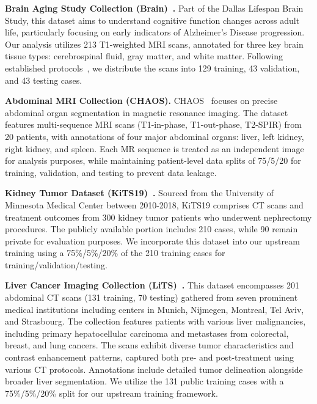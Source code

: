 \noindent\textbf{Brain Aging Study Collection (Brain)~\cite{rodrigue2012beta}.} Part of the Dallas Lifespan Brain Study, this dataset aims to understand cognitive function changes across adult life, particularly focusing on early indicators of Alzheimer's Disease progression. Our analysis utilizes 213 T1-weighted MRI scans, annotated for three key brain tissue types: cerebrospinal fluid, gray matter, and white matter. Following established protocols~\cite{rao2022improving}, we distribute the scans into 129 training, 43 validation, and 43 testing cases.

\noindent\textbf{Abdominal MRI Collection (CHAOS).} CHAOS~\cite{CHAOS2021} focuses on precise abdominal organ segmentation in magnetic resonance imaging. The dataset features multi-sequence MRI scans (T1-in-phase, T1-out-phase, T2-SPIR) from 20 patients, with annotations of four major abdominal organs: liver,  left kidney, right kidney, and spleen. Each MR sequence is treated as an independent image for analysis purposes, while maintaining patient-level data splits of 75/5/20 for training, validation, and testing to prevent data leakage.

\noindent\textbf{Kidney Tumor Dataset (KiTS19)~\cite{heller2019kits19}.} Sourced from the University of Minnesota Medical Center between 2010-2018, KiTS19 comprises CT scans and treatment outcomes from 300 kidney tumor patients who underwent nephrectomy procedures. The publicly available portion includes 210 cases, while 90 remain private for evaluation purposes. We incorporate this dataset into our upstream training using a 75\%/5\%/20\% of the 210 training cases for training/validation/testing.




\noindent\textbf{Liver Cancer Imaging Collection (LiTS)~\cite{bilic2019liver}.} This dataset encompasses 201 abdominal CT scans (131 training, 70 testing) gathered from seven prominent medical institutions including centers in Munich, Nijmegen, Montreal, Tel Aviv, and Strasbourg. The collection features patients with various liver malignancies, including primary hepatocellular carcinoma and metastases from colorectal, breast, and lung cancers. The scans exhibit diverse tumor characteristics and contrast enhancement patterns, captured both pre- and post-treatment using various CT protocols. Annotations include detailed tumor delineation alongside broader liver segmentation. We utilize the 131 public training cases with a 75\%/5\%/20\% split for our upstream training framework.



